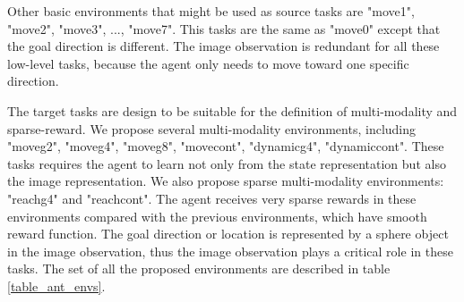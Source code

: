 Other basic environments that might be used as source tasks are "move1", "move2", "move3", ..., "move7". This tasks are the same as "move0" except that the goal direction is different. The image observation is redundant for all these low-level tasks, because the agent only needs to move toward one specific direction.

The target tasks are design to be suitable for the definition of multi-modality and sparse-reward. We propose several multi-modality environments, including "moveg2", "moveg4", "moveg8", "movecont", "dynamicg4", "dynamiccont". These tasks requires the agent to learn not only from the state representation but also the image representation. We also propose sparse multi-modality environments: "reachg4" and "reachcont". The agent receives very sparse rewards in these environments compared with the previous environments, which have smooth reward function. The goal direction or location is represented by a sphere object in the image observation, thus the image observation plays a critical role in these tasks.
The set of all the proposed environments are described in table \ref{table_ant_envs}.


